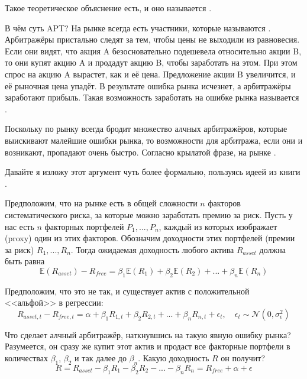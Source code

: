 Такое теоретическое объяснение есть, и оно называется .

В чём суть APT? На рынке всегда есть участники, которые называются 
. Арбитражёры пристально следят за тем, чтобы 
цены не выходили из равновесия. Если они видят, что акция A безосновательно 
подешевела относительно акции B, то они купят акцию A и продадут акцию B, чтобы 
заработать на этом. При этом спрос на акцию A вырастет, как и её цена. 
Предложение акции B увеличится, и её рыночная цена упадёт. В результате ошибка 
рынка исчезнет, а арбитражёры заработают прибыль. Такая возможность заработать 
на ошибке рынка называется .

Поскольку по рынку всегда бродит множество алчных арбитражёров, которые 
выискивают малейшие ошибки рынка, то возможности для арбитража, если они и 
возникают, пропадают очень быстро. Согласно крылатой фразе, на рынке .

Давайте я изложу этот аргумент чуть более формально, пользуясь идеей из книги 
\cite[ch.~9.4]{cochrane2005asset}.

Предположим, что на рынке есть в общей сложности $n$ факторов систематического 
риска, за которые можно заработать премию за риск. Пусть у нас есть $n$ 
факторных портфелей $P_1,...,P_n$, каждый из которых изображает (proxy) один из 
этих факторов. Обозначим доходности этих портфелей (премии за риск)
$R_1,...,R_n$. Тогда ожидаемая доходность любого актива $R_{asset}$ должна быть 
равна
\begin{equation}
\mathbb{E}(R_{asset}) - R_{free} = 
\beta_1\mathbb{E}(R_1) + \beta_2\mathbb{E}(R_2) + ... + \beta_n\mathbb{E}(R_n)
\label{apt_equation}
\end{equation}

Предположим, что это не так, и существует актив с положительной <<альфой>> в 
регрессии:
\begin{equation}
R_{asset,t} - R_{free,t} = \alpha + 
\beta_1R_{1,t} + \beta_2R_{2,t} + ... + \beta_nR_{n,t} + \epsilon_t,
\quad
\epsilon_t \sim \mathcal{N}(0, \sigma_{\epsilon}^2)
\label{apt_regression_example}
\end{equation}


Что сделает алчный арбитражёр, наткнувшись на такую явную ошибку рынка? 
Разумеется, он сразу же купит этот актив и продаст все факторные портфели в 
количествах $\beta_1$, $\beta_2$ и так далее до $\beta_n$. Какую доходность $R$ 
он получит?
\begin{equation*}
R = R_{asset} - \beta_1R_{1} - \beta_2R_{2} - ... - \beta_nR_{n}
= R_{free} + \alpha + \epsilon
\end{equation*}

